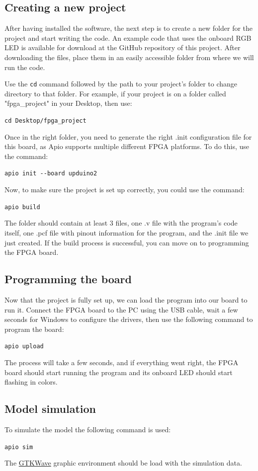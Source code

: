 \documentclass[11pt, a4paper, oneside]{article}
\begin{document}
\subsection{Creating a new project}
After having installed the software, the next step is to create a new folder for the project and start writing the code. An example code that uses the onboard RGB LED is available for download at the GitHub repository of this project. After downloading the files, place them in an easily accessible folder from where we will run the code.

Use the \texttt{cd} command followed by the path to your project's folder to change directory to that folder. For example, if your project is on a folder called "fpga\_project" in your Desktop, then use:
\begin{center}
	\texttt{cd Desktop/fpga\_project}
\end{center}

Once in the right folder, you need to generate the right .init configuration file for this board, as Apio supports multiple different FPGA platforms. To do this, use the command:

\begin{center}
	\texttt{apio init -{}-board upduino2}
\end{center}

Now, to make sure the project is set up correctly, you could use the command:
\begin{center}
	\texttt{apio build}
\end{center}
The folder should contain at least 3 files, one .v file with the program's code itself, one .pcf file with pinout information for the program, and the .init file we just created. If the build process is successful, you can move on to programming the FPGA board.
 
\subsection{Programming the board}
Now that the project is fully set up, we can load the program into our board to run it.
Connect the FPGA board to the PC using the USB cable, wait a few seconds for Windows to configure the drivers, then use the following command to program the board:
\begin{center}
	\texttt{apio upload}
\end{center}
The process will take a few seconds, and if everything went right, the FPGA board should start running the program and its onboard LED should start flashing in colors.

\subsection{Model simulation}
To simulate the model the following command is used:
\begin{center}
	\texttt{apio sim}
\end{center}

The \href{http://gtkwave.sourceforge.net}{GTKWave} graphic environment should be load with the simulation data.

\end{document}
